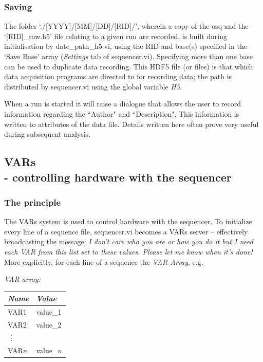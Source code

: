 \documentclass[10pt,a4paper]{article}
\begin{document}
\subsubsection{Saving}
The folder `./[YYYY]/[MM]/[DD]/[RID]/', wherein a copy of the osq and the `[RID]\_raw.h5' file relating to a given run are recorded, is built during initialisation by date\_path\_h5.vi, using the RID and base(s) specified in the `Save Base' array (\emph{Settings} tab of sequencer.vi).   Specifying more than one base can be used to duplicate data recording.  This HDF5 file (or files) is that which data acquisition programs are directed to for recording data; the path is distributed by sequencer.vi using the global variable \emph{H5}.

When a run is started it will raise a dialogue that allows the user to record information regarding the ``Author" and ``Description".  This information is written to attributes of the data file.  Details written here often prove very useful during subsequent analysis. 

\subsection[VARs]{\label{sex:var}VARs \\ %
	\normalsize - controlling hardware with the sequencer}

\subsubsection{The principle}
The VARs system is used to control hardware with the sequencer.  To initialize every line of a sequence file, sequencer.vi becomes a VARs server -- effectively broadcasting the message: \emph{I don't care who you are or how you do it but I need each VAR from this list set to these values. Please let me know when it's done!}  More explicitly, for each line of a sequence the \emph{VAR Array}, e.g.

\hangindent=0.7cm
\emph{VAR array:} \\
\begin{tabularx}{0.3\textwidth}{X|X}
	\emph{Name} & \emph{Value} \\
	\hline
	VAR1 & value\_1 \\
	VAR2 & value\_2 \\
	\vdots & \\
	VAR$n$ & value\_$n$ \\
\end{tabularx}
\end{document}
